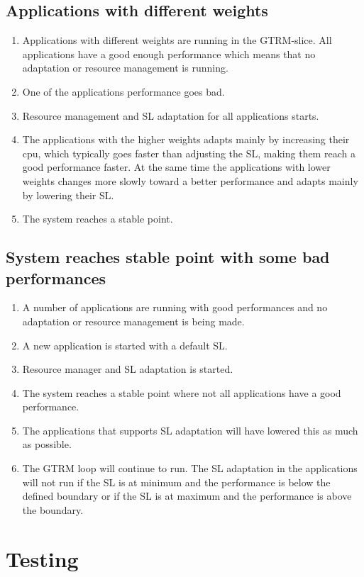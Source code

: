 \documentclass[nobiblatex]{LTHthesis}
\begin{document}
\section{Applications with different weights}
\begin{enumerate}
\item Applications with different weights are running in the GTRM-slice. All applications have a good enough performance which means that no adaptation or resource management is running. 
\item One of the applications performance goes bad.
\item Resource management and SL adaptation for all applications starts.
\item The applications with the higher weights adapts mainly by increasing their cpu, which typically goes faster than adjusting the SL, making them reach a good performance faster. At the same time the applications with lower weights changes more slowly toward a better performance and adapts mainly by lowering their SL.
\item The system reaches a stable point.
\end{enumerate}

\section{System reaches stable point with some bad performances}
\begin{enumerate}
\item A number of applications are running with good performances and no adaptation or resource management is being made.
\item A new application is started with a default SL.
\item Resource manager and SL adaptation is started.
\item The system reaches a stable point where not all applications have a good performance. 
\item The applications that supports SL adaptation will have lowered this as much as possible.
\item The GTRM loop will continue to run. The SL adaptation in the applications will not run if the SL is at minimum and the performance is below the defined boundary or if the SL is at maximum and the performance is above the boundary.
\end{enumerate}

\chapter{Testing}
\label{chp:test}
\end{document}

